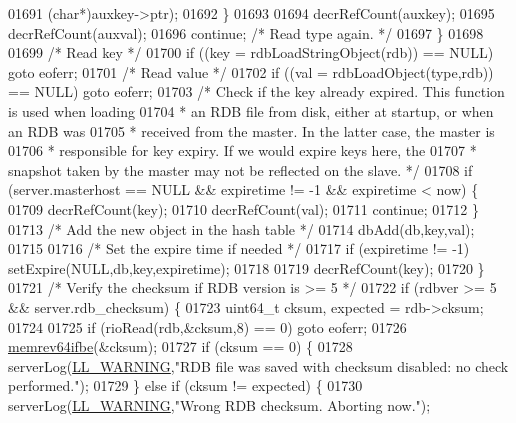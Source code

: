 \begin{DoxyCode}
{{{{{{{{{{{{{{{{{{{{{{{{{{{{{{{{{{01691                     (\textcolor{keywordtype}{char}*)auxkey->ptr);
01692             \}
01693 
01694             decrRefCount(auxkey);
01695             decrRefCount(auxval);
01696             \textcolor{keywordflow}{continue}; \textcolor{comment}{/* Read type again. */}
01697         \}
01698 
01699         \textcolor{comment}{/* Read key */}
01700         \textcolor{keywordflow}{if} ((key = rdbLoadStringObject(rdb)) == NULL) \textcolor{keywordflow}{goto} eoferr;
01701         \textcolor{comment}{/* Read value */}
01702         \textcolor{keywordflow}{if} ((val = rdbLoadObject(type,rdb)) == NULL) \textcolor{keywordflow}{goto} eoferr;
01703         \textcolor{comment}{/* Check if the key already expired. This function is used when loading}
01704 \textcolor{comment}{         * an RDB file from disk, either at startup, or when an RDB was}
01705 \textcolor{comment}{         * received from the master. In the latter case, the master is}
01706 \textcolor{comment}{         * responsible for key expiry. If we would expire keys here, the}
01707 \textcolor{comment}{         * snapshot taken by the master may not be reflected on the slave. */}
01708         \textcolor{keywordflow}{if} (server.masterhost == NULL && expiretime != -1 && expiretime < now) \{
01709             decrRefCount(key);
01710             decrRefCount(val);
01711             \textcolor{keywordflow}{continue};
01712         \}
01713         \textcolor{comment}{/* Add the new object in the hash table */}
01714         dbAdd(db,key,val);
01715 
01716         \textcolor{comment}{/* Set the expire time if needed */}
01717         \textcolor{keywordflow}{if} (expiretime != -1) setExpire(NULL,db,key,expiretime);
01718 
01719         decrRefCount(key);
01720     \}
01721     \textcolor{comment}{/* Verify the checksum if RDB version is >= 5 */}
01722     \textcolor{keywordflow}{if} (rdbver >= 5 && server.rdb\_checksum) \{
01723         uint64\_t cksum, expected = rdb->cksum;
01724 
01725         \textcolor{keywordflow}{if} (rioRead(rdb,&cksum,8) == 0) \textcolor{keywordflow}{goto} eoferr;
01726         \hyperlink{endianconv_8h_aa311b9f944c3b988f3601698a95890c1}{memrev64ifbe}(&cksum);
01727         \textcolor{keywordflow}{if} (cksum == 0) \{
01728             serverLog(\hyperlink{server_8h_a31229b9334bba7d6be2a72970967a14b}{LL\_WARNING},\textcolor{stringliteral}{"RDB file was saved with checksum disabled: no check
       performed."});
01729         \} \textcolor{keywordflow}{else} \textcolor{keywordflow}{if} (cksum != expected) \{
01730             serverLog(\hyperlink{server_8h_a31229b9334bba7d6be2a72970967a14b}{LL\_WARNING},\textcolor{stringliteral}{"Wrong RDB checksum. Aborting now."});
}}}}}}}}}}}}}}}}}}}}}}}}}}}}}}}}}}
\end{DoxyCode}
